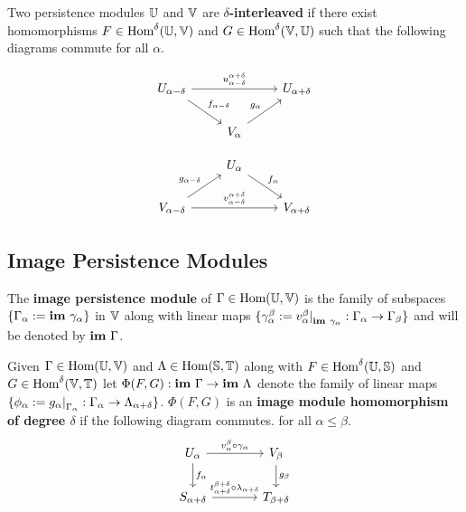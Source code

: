 Two persistence modules $\mathbb{U}$ and $\mathbb{V}$ are \textbf{$\delta$-interleaved} if there exist homomorphisms $F\in\text{Hom}^\delta(\mathbb{U}, \mathbb{V})$ and $G \in\text{Hom}^\delta(\mathbb{V},\mathbb{U})$ such that the following diagrams commute for all $\alpha$.
\begin{minipage}{0.45\textwidth}
\begin{equation}\label{dgm:interleaving1}
  \begin{tikzcd}
    U_{\alpha-\delta}\arrow{rr}{u_{\alpha-\delta}^{\alpha+\delta}}\arrow{dr}{f_{\alpha-\delta}} & &
    U_{\alpha+\delta}\\
    & V_{\alpha}\arrow{ur}{g_\alpha} &
\end{tikzcd}\end{equation}
\end{minipage}
\begin{minipage}{0.45\textwidth}
\begin{equation}\label{dgm:interleaving2}
  \begin{tikzcd}
    & U_{\alpha}\arrow{dr}{f_\alpha} &\\
    V_{\alpha-\delta}\arrow{rr}{v_{\alpha-\delta}^{\alpha+\delta}}\arrow{ur}{g_{\alpha-\delta}} & &
    V_{\alpha+\delta}
\end{tikzcd}\end{equation}
\end{minipage}

\subsection{Image Persistence Modules}

The \textbf{image persistence module} of $\Gamma\in\text{Hom}(\mathbb{U},\mathbb{V})$ is the family of subspaces $\{\Gamma_\alpha :=\mathbf{im}~\gamma_\alpha\}$ in $\mathbb{V}$ along with linear maps $\{\gamma_\alpha^\beta := v_\alpha^\beta\mathord{\mid}_{\mathbf{im}~\gamma_\alpha} : \Gamma_\alpha\to\Gamma_\beta\}$ and will be denoted by $\mathbf{im}~\Gamma$.

Given $\Gamma\in\text{Hom}(\mathbb{U},\mathbb{V})$ and $\Lambda\in\text{Hom}(\mathbb{S},\mathbb{T})$ along with $F\in\text{Hom}^\delta(\mathbb{U},\mathbb{S})$ and $G\in\text{Hom}^\delta(\mathbb{V},\mathbb{T})$ let $\Phi(F, G) : \mathbf{im}~\Gamma\to\mathbf{im}~\Lambda$ denote the family of linear maps $\{\phi_\alpha := g_\alpha\mathord{\mid}_{\Gamma_\alpha} : \Gamma_\alpha\to\Lambda_{\alpha+\delta}\}$.
$\Phi(F, G)$ is an \textbf{image module homomorphism of degree $\delta$} if the following diagram commutes.
for all $\alpha\leq\beta$.
\begin{equation}\label{dgm:shifted_homomorphism}
  \begin{tikzcd}[column sep=large]
    U_\alpha\arrow{r}{v_\alpha^\beta\circ\gamma_\alpha}\arrow{d}{f_\alpha} &
    V_\beta\arrow{d}{g_\beta}\\
    S_{\alpha+\delta}\arrow{r}{t_{\alpha+\delta}^{\beta+\delta}\circ\lambda_{\alpha+\delta}} &
    T_{\beta +\delta}
\end{tikzcd}\end{equation}

